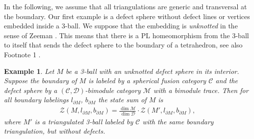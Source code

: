 \documentclass[1.5pt, a4paper]{article}
\newcommand{\mac}{\mathcal C}
\newcommand{\mad}{\mathcal D}
\newcommand{\mam}{\mathcal M}
\newtheorem{example}[theorem]{Example}
\begin{document}
In the following, we assume that all triangulations are generic and transversal at the boundary. 
Our first example is a defect sphere without defect lines or vertices embedded inside a 3-ball.  We suppose that the embedding is \emph{unknotted} in the sense of Zeeman \cite{Z}. This means that there is a PL homeomorphism from the 3-ball to itself that  sends the defect sphere to the boundary of a tetrahedron, see also Footnote 1  \cite{Z}.

\begin{example} \label{ex:tetrahedronsphere} Let $M$ be a 3-ball with an unknotted defect sphere  in its interior. Suppose the boundary of $M$ is labeled by a spherical fusion category $\mac$ and the defect sphere by 
 a $(\mac, \mad)$-bimodule category  $\mam$ with a bimodule trace.  Then for all boundary labelings $l_{\partial M}$, $b_{\partial M}$ the state sum of $M$ is
 \begin{align}\label{eq:bublle}
\mathcal Z(M, l_{\partial M},b_{\partial M})=\frac{\dim\mam}{\dim \mad}\cdot \mathcal Z(M', l_{\partial M}, b_{\partial M}), 
\end{align}
where $M'$ is a triangulated 3-ball labeled by $\mac$ with the same  boundary triangulation, but without defects. 
\end{example}
\end{document}
